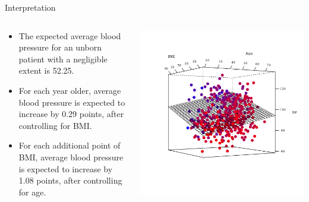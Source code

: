 \documentclass[10pt]{beamer}\usepackage[]{graphicx}\usepackage[]{color}
\begin{document}

\begin{frame}[fragile]{Interpretation}

  \begin{columns}
    \begin{column}{0.5\textwidth}

      \begin{itemize}
      \item The expected average blood pressure for an unborn patient with a
        negligible extent is 52.25.
        \vb
      \item For each year older, average blood pressure is expected to increase
        by 0.29 points, after controlling for
        BMI.
        \vb
      \item For each additional point of BMI, average blood pressure is
        expected to increase by 1.08 points,
        after controlling for age.
      \end{itemize}

    \end{column}

    \begin{column}{0.5\textwidth}

      \includegraphics[width = 1.1\textwidth]{figures/response_surface_plot2}

    \end{column}
  \end{columns}

\end{frame}
\end{document}
